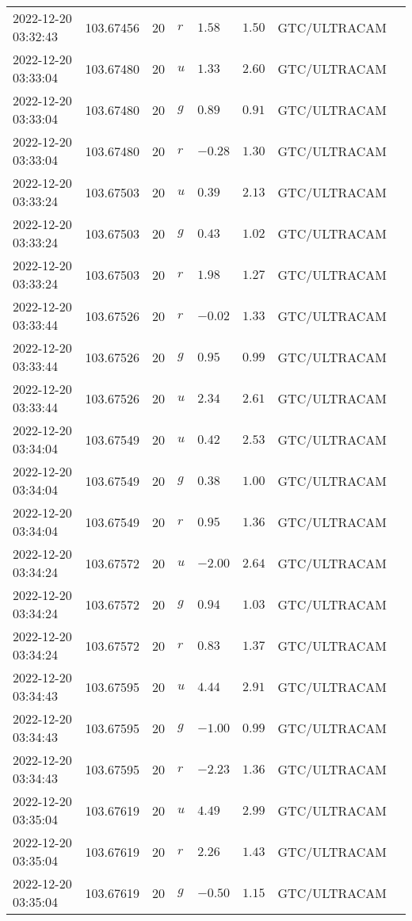 \documentclass{nature_plusfigure}
\begin{document}
\begin{supplement}
\begin{center}
\begin{longtable}{llllllll}
2022-12-20 03:32:43 & 103.67456 & 20 & $r$ & $1.58$ & $1.50$ & GTC/ULTRACAM &  \\ 
2022-12-20 03:33:04 & 103.67480 & 20 & $u$ & $1.33$ & $2.60$ & GTC/ULTRACAM &  \\ 
2022-12-20 03:33:04 & 103.67480 & 20 & $g$ & $0.89$ & $0.91$ & GTC/ULTRACAM &  \\ 
2022-12-20 03:33:04 & 103.67480 & 20 & $r$ & $-0.28$ & $1.30$ & GTC/ULTRACAM &  \\ 
2022-12-20 03:33:24 & 103.67503 & 20 & $u$ & $0.39$ & $2.13$ & GTC/ULTRACAM &  \\ 
2022-12-20 03:33:24 & 103.67503 & 20 & $g$ & $0.43$ & $1.02$ & GTC/ULTRACAM &  \\ 
2022-12-20 03:33:24 & 103.67503 & 20 & $r$ & $1.98$ & $1.27$ & GTC/ULTRACAM &  \\ 
2022-12-20 03:33:44 & 103.67526 & 20 & $r$ & $-0.02$ & $1.33$ & GTC/ULTRACAM &  \\ 
2022-12-20 03:33:44 & 103.67526 & 20 & $g$ & $0.95$ & $0.99$ & GTC/ULTRACAM &  \\ 
2022-12-20 03:33:44 & 103.67526 & 20 & $u$ & $2.34$ & $2.61$ & GTC/ULTRACAM &  \\ 
2022-12-20 03:34:04 & 103.67549 & 20 & $u$ & $0.42$ & $2.53$ & GTC/ULTRACAM &  \\ 
2022-12-20 03:34:04 & 103.67549 & 20 & $g$ & $0.38$ & $1.00$ & GTC/ULTRACAM &  \\ 
2022-12-20 03:34:04 & 103.67549 & 20 & $r$ & $0.95$ & $1.36$ & GTC/ULTRACAM &  \\ 
2022-12-20 03:34:24 & 103.67572 & 20 & $u$ & $-2.00$ & $2.64$ & GTC/ULTRACAM &  \\ 
2022-12-20 03:34:24 & 103.67572 & 20 & $g$ & $0.94$ & $1.03$ & GTC/ULTRACAM &  \\ 
2022-12-20 03:34:24 & 103.67572 & 20 & $r$ & $0.83$ & $1.37$ & GTC/ULTRACAM &  \\ 
2022-12-20 03:34:43 & 103.67595 & 20 & $u$ & $4.44$ & $2.91$ & GTC/ULTRACAM &  \\ 
2022-12-20 03:34:43 & 103.67595 & 20 & $g$ & $-1.00$ & $0.99$ & GTC/ULTRACAM &  \\ 
2022-12-20 03:34:43 & 103.67595 & 20 & $r$ & $-2.23$ & $1.36$ & GTC/ULTRACAM &  \\ 
2022-12-20 03:35:04 & 103.67619 & 20 & $u$ & $4.49$ & $2.99$ & GTC/ULTRACAM &  \\ 
2022-12-20 03:35:04 & 103.67619 & 20 & $r$ & $2.26$ & $1.43$ & GTC/ULTRACAM &  \\ 
2022-12-20 03:35:04 & 103.67619 & 20 & $g$ & $-0.50$ & $1.15$ & GTC/ULTRACAM &  \\ 

\end{longtable}
\end{center}
\end{supplement}
\end{document}
